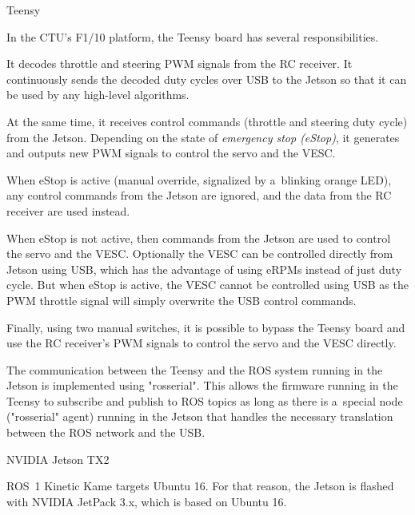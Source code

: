  Teensy

In the CTU's F1/10 platform, the Teensy board has several responsibilities.

It decodes throttle and steering PWM signals from the RC receiver. It continuously sends the decoded duty cycles over USB to the Jetson so that it can be used by any high-level algorithms.

At the same time, it receives control commands (throttle and steering duty cycle) from the Jetson. Depending on the state of {\em emergency stop (eStop)}, it generates and outputs new PWM signals to control the servo and the VESC.

When eStop is active (manual override, signalized by a~blinking orange LED), any control commands from the Jetson are ignored, and the data from the RC receiver are used instead.

When eStop is not active, then commands from the Jetson are used to control the servo and the VESC. Optionally the VESC can be controlled directly from Jetson using USB, which has the advantage of using eRPMs instead of just duty cycle. But when eStop is active, the VESC cannot be controlled using USB as the PWM throttle signal will simply overwrite the USB control commands.

Finally, using two manual switches, it is possible to bypass the Teensy board and use the RC receiver's PWM signals to control the servo and the VESC directly.

The communication between the Teensy and the ROS system running in the Jetson is implemented using "rosserial". This allows the firmware running in the Teensy to subscribe and publish to ROS topics as long as there is a~special node ("rosserial" agent) running in the Jetson that handles the necessary translation between the ROS network and the USB.

\secc NVIDIA Jetson TX2

ROS~1 Kinetic Kame targets Ubuntu 16. For that reason, the Jetson is flashed with NVIDIA JetPack 3.x, which is based on Ubuntu 16.
